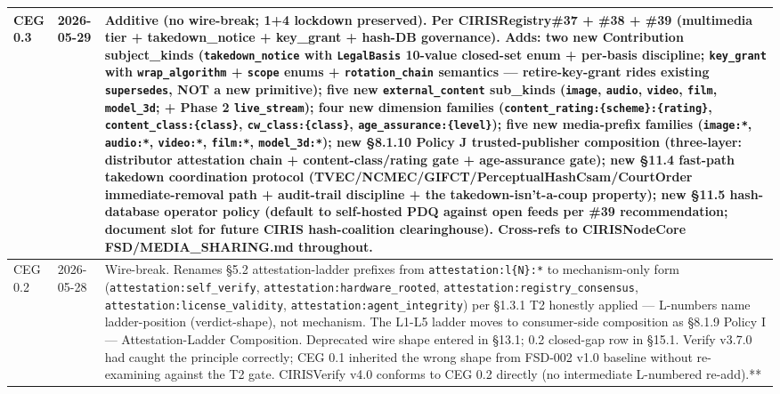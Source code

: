 \documentclass[10pt]{article}
\begin{document}
{\begin{longtable}{|p{5.33cm}|p{5.33cm}|p{5.33cm}|}
\textbf{CEG 0.3} & \textbf{2026-05-29} & \textbf{Additive (no wire-break; 1+4 lockdown preserved). Per CIRISRegistry\#37 + \#38 + \#39 (multimedia tier + takedown\_notice + key\_grant + hash-DB governance).} Adds: two new Contribution subject\_kinds (\texttt{takedown\_notice} with \texttt{LegalBasis} 10-value closed-set enum + per-basis discipline; \texttt{key\_grant} with \texttt{wrap\_algorithm} + \texttt{scope} enums + \texttt{rotation\_chain} semantics — retire-key-grant rides existing \texttt{supersedes}, NOT a new primitive); five new \texttt{external\_content} sub\_kinds (\texttt{image}, \texttt{audio}, \texttt{video}, \texttt{film}, \texttt{model\_3d}; + Phase 2 \texttt{live\_stream}); four new dimension families (\texttt{content\_rating:\{scheme\}:\{rating\}}, \texttt{content\_class:\{class\}}, \texttt{cw\_class:\{class\}}, \texttt{age\_assurance:\{level\}}); five new media-prefix families (\texttt{image:*}, \texttt{audio:*}, \texttt{video:*}, \texttt{film:*}, \texttt{model\_3d:*}); new §8.1.10 Policy J trusted-publisher composition (three-layer: distributor attestation chain + content-class/rating gate + age-assurance gate); new §11.4 fast-path takedown coordination protocol (TVEC/NCMEC/GIFCT/PerceptualHashCsam/CourtOrder immediate-removal path + audit-trail discipline + the takedown-isn't-a-coup property); new §11.5 hash-database operator policy (default to self-hosted PDQ against open feeds per \#39 recommendation; document slot for future CIRIS hash-coalition clearinghouse). Cross-refs to CIRISNodeCore FSD/MEDIA\_SHARING.md throughout. \\ \hline
CEG 0.2 & 2026-05-28 & Wire-break. Renames §5.2 attestation-ladder prefixes from \texttt{attestation:l\{N\}:*} to mechanism-only form (\texttt{attestation:self\_verify}, \texttt{attestation:hardware\_rooted}, \texttt{attestation:registry\_consensus}, \texttt{attestation:license\_validity}, \texttt{attestation:agent\_integrity}) per §1.3.1 T2 honestly applied — L-numbers name ladder-position (verdict-shape), not mechanism. The L1-L5 ladder moves to consumer-side composition as §8.1.9 Policy I — Attestation-Ladder Composition. Deprecated wire shape entered in §13.1; 0.2 closed-gap row in §15.1. Verify v3.7.0 had caught the principle correctly; CEG 0.1 inherited the wrong shape from FSD-002 v1.0 baseline without re-examining against the T2 gate. CIRISVerify v4.0 conforms to CEG 0.2 directly (no intermediate L-numbered re-add).** \\ \hline

\end{longtable}}
\end{document}

